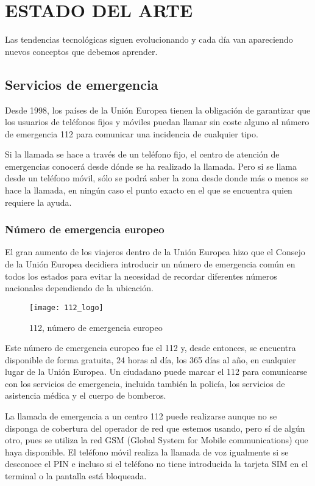 \chapter{ESTADO DEL ARTE\label{sec:estado_del_arte}}

\clearpage

Las tendencias tecnológicas siguen evolucionando y cada día van apareciendo nuevos conceptos que debemos aprender.

\section{Servicios de emergencia}

Desde 1998, los países de la Unión Europea tienen la obligación de garantizar que los usuarios de teléfonos fijos y móviles puedan llamar sin coste alguno al número de emergencia 112 para comunicar una incidencia de cualquier tipo.

Si la llamada se hace a través de un teléfono fijo, el centro de atención de emergencias conocerá desde dónde se ha realizado la llamada. Pero si se llama desde un teléfono móvil, sólo se podrá saber la zona desde donde más o menos se hace la llamada, en ningún caso el punto exacto en el que se encuentra quien requiere la ayuda.

\subsection{Número de emergencia europeo}

El gran aumento de los viajeros dentro de la Unión Europea hizo que el Consejo de la Unión Europea decidiera introducir un número de emergencia común en todos los estados para evitar la necesidad de recordar diferentes números nacionales dependiendo de la ubicación.

\begin{figure}[htp!]
  \centering
  \texttt{[image: 112\_logo]}
  \caption{112, número de emergencia europeo}
  \label{fig:112_logo}
\end{figure}

Este número de emergencia europeo fue el 112 y, desde entonces, se encuentra disponible de forma gratuita, 24 horas al día, los 365 días al año, en cualquier lugar de la Unión Europea. Un ciudadano puede marcar el 112 para comunicarse con los servicios de emergencia, incluida también la policía, los servicios de asistencia médica y el cuerpo de bomberos.

La llamada de emergencia a un centro 112 puede realizarse aunque no se disponga de cobertura del operador de red que estemos usando, pero sí de algún otro, pues se utiliza la red GSM (Global System for Mobile communications) que haya disponible. El teléfono móvil realiza la llamada de voz igualmente si se desconoce el PIN e incluso si el teléfono no tiene introducida la tarjeta SIM en el terminal o la pantalla está bloqueada.

